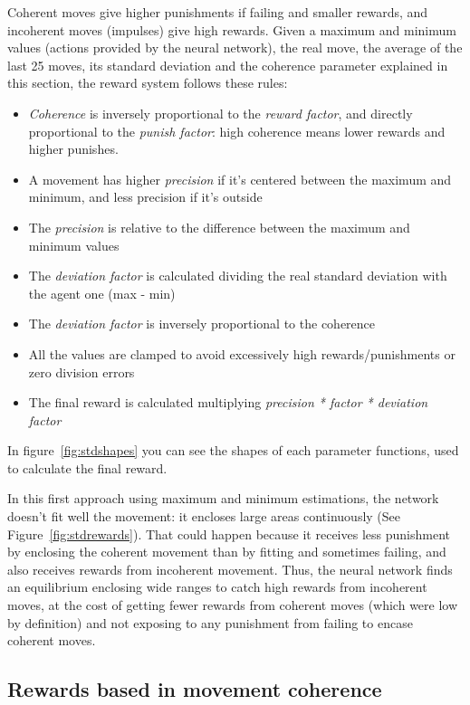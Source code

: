 Coherent moves give higher punishments if failing and smaller rewards, and incoherent moves (impulses) give high rewards. Given a maximum and minimum values (actions provided by the neural network), the real move, the average of the last 25 moves, its standard deviation and the coherence parameter explained in this section, the reward system follows these rules:

\begin{itemize}
 \item \emph{Coherence} is inversely proportional to the \emph{reward factor}, and directly proportional to the \emph{punish factor}: high coherence means lower rewards and higher punishes.
 \item A movement has higher \emph{precision} if it's centered between the maximum and minimum, and less precision if it's outside
 \item The \emph{precision} is relative to the difference between the maximum and minimum values
 \item The \emph{deviation factor} is calculated dividing the real standard deviation with the agent one (max - min)
 \item The \emph{deviation factor} is inversely proportional to the coherence
 \item All the values are clamped to avoid excessively high rewards/punishments or zero division errors
 \item The final reward is calculated multiplying \emph{precision * factor * deviation factor}
\end{itemize}

In figure~\ref{fig:stdshapes} you can see the shapes of each parameter functions, used to calculate the final reward.


In this first approach using maximum and minimum estimations, the network doesn't fit well the movement: it encloses large areas continuously (See Figure~\ref{fig:stdrewards}). That could happen because it receives less punishment by enclosing the coherent movement than by fitting and sometimes failing, and also receives rewards from incoherent movement. Thus, the neural network finds an equilibrium enclosing wide ranges to catch high rewards from incoherent moves, at the cost of getting fewer rewards from coherent moves (which were low by definition) and not exposing to any punishment from failing to encase coherent moves.

\subsection{Rewards based in movement coherence}
\label{sec:cohrew}

